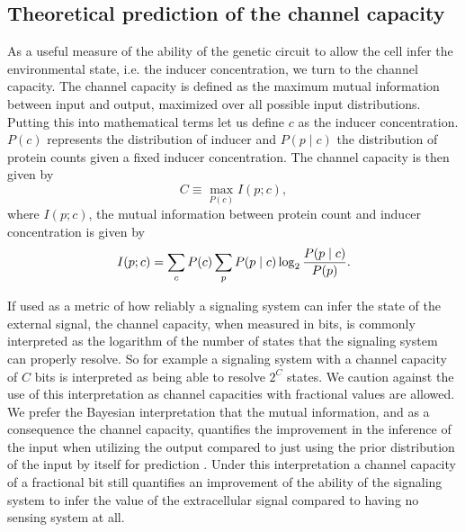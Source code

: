 \subsection*{Theoretical prediction of the channel capacity}
\label{sec_channcap}

As a useful measure of the ability of the genetic circuit to allow the cell
infer the environmental state, i.e. the inducer concentration, we turn to the
channel capacity. The channel capacity is defined as the maximum mutual
information between input and output, maximized over all possible input
distributions. Putting this into mathematical terms let us define $c$ as the
inducer concentration. $P(c)$ represents the distribution of inducer and $P(p
\mid c)$ the distribution of protein counts given a fixed inducer concentration.
The channel capacity is then given by
\begin{equation}
  C \equiv \max_{P(c)} I(p; c),
  \label{eq_chann_cap}
\end{equation}
where $I(p; c)$, the mutual information between protein count and inducer
concentration is given by \cite{Shannon1948}
\begin{equation}
  I(p; c) = \sum_c P(c) \sum_p P(p \mid c) \log_2 {P(p \mid c) \over P(p)}.
\end{equation}

If used as a metric of how reliably a signaling system can infer the state
of the external signal, the channel capacity, when measured in bits, is commonly
interpreted as the logarithm of the number of states that the signaling system
can properly resolve. So for example a signaling system with a channel capacity
of $C$ bits is interpreted as being able to resolve $2^C$ states. We caution
against the use of this interpretation as channel capacities with fractional
values are allowed. We prefer the Bayesian interpretation that the mutual
information, and as a consequence the channel capacity, quantifies the
improvement in the inference of the input when utilizing the output compared to
just using the prior distribution of the input by itself for prediction
\cite{Voliotis2014, Bowsher2014}. Under this interpretation a channel capacity
of a fractional bit still quantifies an improvement of the ability of the
signaling system to infer the value of the extracellular signal compared to
having no sensing system at all.

